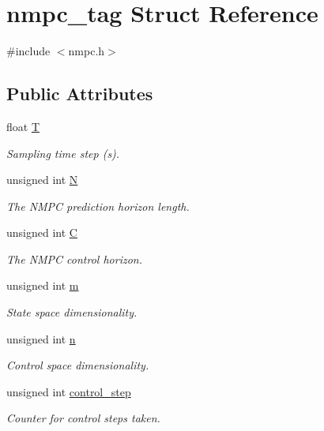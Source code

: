 \hypertarget{structnmpc__tag}{\section{nmpc\-\_\-tag Struct Reference}
\label{structnmpc__tag}
}


{\ttfamily \#include $<$nmpc.\-h$>$}

\subsection*{Public Attributes}
\begin{DoxyCompactItemize}
\item 
float \hyperlink{structnmpc__tag_abcbd054e1e90f07961a20d933eec6954}{T}
\begin{DoxyCompactList}\small\item\em Sampling time step (s). \end{DoxyCompactList}\item 
unsigned int \hyperlink{structnmpc__tag_ab0e6fcef53bf96255ed8250d7b92ad33}{N}
\begin{DoxyCompactList}\small\item\em The N\-M\-P\-C prediction horizon length. \end{DoxyCompactList}\item 
unsigned int \hyperlink{structnmpc__tag_a48579bcab6b011067bdf223e51ed489b}{C}
\begin{DoxyCompactList}\small\item\em The N\-M\-P\-C control horizon. \end{DoxyCompactList}\item 
unsigned int \hyperlink{structnmpc__tag_a9a0daa89f7ae6bbd47452b9250e0d6a5}{m}
\begin{DoxyCompactList}\small\item\em State space dimensionality. \end{DoxyCompactList}\item 
unsigned int \hyperlink{structnmpc__tag_a8d8c004fbbaba22a78a44e9b712054c4}{n}
\begin{DoxyCompactList}\small\item\em Control space dimensionality. \end{DoxyCompactList}\item 
unsigned int \hyperlink{structnmpc__tag_ab3491736c176c8d799296d1ecc899443}{control\-\_\-step}
\begin{DoxyCompactList}\small\item\em Counter for control steps taken. \end{DoxyCompactList}\item 

\end{DoxyCompactItemize}
